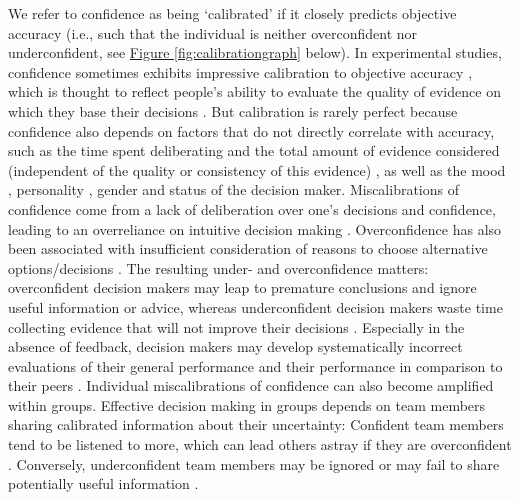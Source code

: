 \documentclass[a4paper, nobind]{templates/ociamthesis}
\begin{document}
\hfill\break
We refer to confidence as being `calibrated' if it closely predicts objective accuracy (i.e., such that the individual is neither overconfident nor underconfident, see \hyperref[fig:calibrationgraph]{Figure \ref{fig:calibrationgraph}} below). In experimental studies, confidence sometimes exhibits impressive calibration to objective accuracy \autocite{boldt_shared_2015}, which is thought to reflect people's ability to evaluate the quality of evidence on which they base their decisions \autocite{xue_challenging_2023}. But calibration is rarely perfect because confidence also depends on factors that do not directly correlate with accuracy, such as the time spent deliberating and the total amount of evidence considered (independent of the quality or consistency of this evidence) \autocite{kiani_choice_2014}, as well as the mood \autocite{rouault_psychiatric_2018}, personality \autocite{schaefer_overconfidence_2004}, gender \autocite{syzmanowicz_gender_2011} and status \autocite{see_detrimental_2011} of the decision maker. Miscalibrations of confidence come from a lack of deliberation over one's decisions and confidence, leading to an overreliance on intuitive decision making \autocite{mata_metacognitive_2013}. Overconfidence has also been associated with insufficient consideration of reasons to choose alternative options/decisions \autocite{koriat_reasons_1980,scherer_trust_2015}. The resulting under- and overconfidence matters: overconfident decision makers may leap to premature conclusions and ignore useful information or advice, whereas underconfident decision makers waste time collecting evidence that will not improve their decisions \autocite{desender_subjective_2018}. Especially in the absence of feedback, decision makers may develop systematically incorrect evaluations of their general performance \autocite{rouault_forming_2019} and their performance in comparison to their peers \autocite{kruger_unskilled_1999}. Individual miscalibrations of confidence can also become amplified within groups. Effective decision making in groups depends on team members sharing calibrated information about their uncertainty: Confident team members tend to be listened to more, which can lead others astray if they are overconfident \autocite{zarnoth_social_1997}. Conversely, underconfident team members may be ignored or may fail to share potentially useful information \autocite{silver_wise_2021,larson1996}.

\newpage
\end{document}
